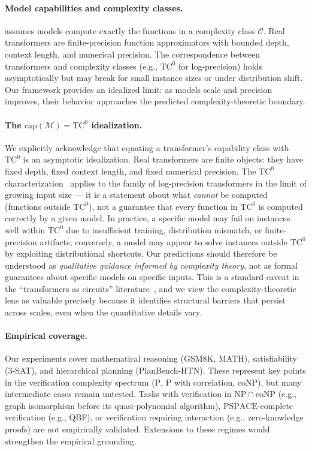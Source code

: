 \documentclass{article}
\theoremstyle{definition}
\theoremstyle{remark}
\newcommand{\TC}{\mathrm{TC}^0}
\newcommand{\PTIME}{\mathrm{P}}
\newcommand{\NP}{\mathrm{NP}}
\newcommand{\coNP}{\mathrm{coNP}}
\newcommand{\PSPACE}{\mathrm{PSPACE}}
\newcommand{\calM}{\mathcal{M}}         %
\newcommand{\calC}{\mathcal{C}}         %
\begin{document}
\paragraph{Model capabilities and complexity classes.}
 assumes models compute exactly the functions in a complexity class $\calC$. Real transformers are finite-precision function approximators with bounded depth, context length, and numerical precision. The correspondence between transformers and complexity classes (e.g., $\TC$ for log-precision) holds asymptotically but may break for small instance sizes or under distribution shift. Our framework provides an idealized limit: as models scale and precision improves, their behavior approaches the predicted complexity-theoretic boundary.

\paragraph{The $\mathrm{cap}(\calM) = \TC$ idealization.}
We explicitly acknowledge that equating a transformer's capability class with $\TC$ is an asymptotic idealization.
Real transformers are finite objects: they have fixed depth, fixed context length, and fixed numerical precision.
The $\TC$ characterization~\citep{merrill2022saturated} applies to the family of log-precision transformers in the limit of growing input size --- it is a statement about what \emph{cannot} be computed (functions outside $\TC$), not a guarantee that every function in $\TC$ is computed correctly by a given model.
In practice, a specific model may fail on instances well within $\TC$ due to insufficient training, distribution mismatch, or finite-precision artifacts; conversely, a model may appear to solve instances outside $\TC$ by exploiting distributional shortcuts.
Our predictions should therefore be understood as \emph{qualitative guidance informed by complexity theory}, not as formal guarantees about specific models on specific inputs.
This is a standard caveat in the ``transformers as circuits'' literature~\citep{merrill2022saturated,merrill2024expressive}, and we view the complexity-theoretic lens as valuable precisely because it identifies structural barriers that persist across scales, even when the quantitative details vary.

\paragraph{Empirical coverage.}
Our experiments cover mathematical reasoning (GSM8K, MATH), satisfiability (3-SAT), and hierarchical planning (PlanBench-HTN). These represent key points in the verification complexity spectrum ($\PTIME$, $\PTIME$ with correlation, $\coNP$), but many intermediate cases remain untested. Tasks with verification in $\NP \cap \coNP$ (e.g., graph isomorphism before its quasi-polynomial algorithm), $\PSPACE$-complete verification (e.g., QBF), or verification requiring interaction (e.g., zero-knowledge proofs) are not empirically validated. Extensions to these regimes would strengthen the empirical grounding.
\end{document}
